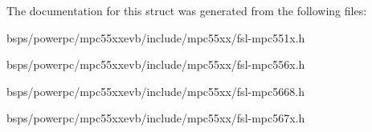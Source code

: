 The documentation for this struct was generated from the following files\+:\begin{DoxyCompactItemize}
\item 
bsps/powerpc/mpc55xxevb/include/mpc55xx/fsl-\/mpc551x.\+h\item 
bsps/powerpc/mpc55xxevb/include/mpc55xx/fsl-\/mpc556x.\+h\item 
bsps/powerpc/mpc55xxevb/include/mpc55xx/fsl-\/mpc5668.\+h\item 
bsps/powerpc/mpc55xxevb/include/mpc55xx/fsl-\/mpc567x.\+h\end{DoxyCompactItemize}
